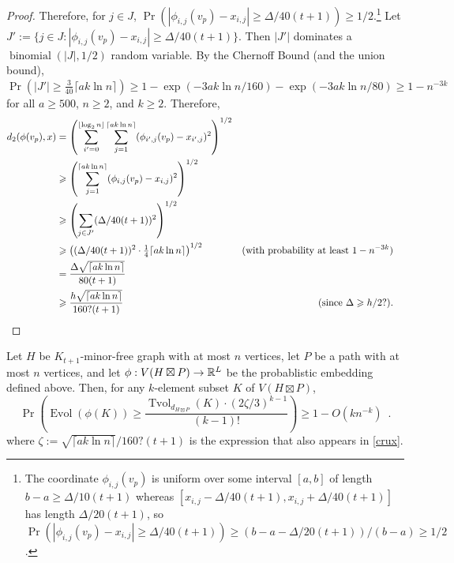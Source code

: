 \documentclass{patmorin}
\renewcommand{\ge}{\geqslant}
\DeclareMathOperator{\evol}{Evol}
\DeclareMathOperator{\tvol}{Tvol}
\begin{document}
\begin{proof}
  Therefore, for $j\in J$, $\Pr(|\phi_{i,j}(v_p)-x_{i,j}|\ge \Delta/40(t+1))\ge 1/2$.\footnote{The coordinate $\phi_{i,j}(v_p)$ is uniform over some interval $[a,b]$ of length $b-a\ge \Delta/10(t+1)$ whereas $[x_{i,j}-\Delta/40(t+1),x_{i,j}+\Delta/40(t+1)]$ has length $\Delta/20(t+1)$, so $\Pr(|\phi_{i,j}(v_p)-x_{i,j}|\ge \Delta/40(t+1))\ge (b-a-\Delta/20(t+1))/(b-a)\ge 1/2$.}
  Let $J':=\{j\in J:  |\phi_{i,j}(v_p)-x_{i,j}|\ge \Delta/40(t+1)\}$.  Then $|J'|$ dominates a $\operatorname{binomial}(|J|,1/2)$ random variable.  By the Chernoff Bound (and the union bound), $\Pr(|J'|\ge \tfrac{3}{40}\lceil a k\ln n\rceil)\ge 1-\exp(-3ak\ln n/160)-\exp(-3ak\ln n/80)\ge 1-n^{-3k}$ for all $a\ge 500$, $n\ge 2$, and $k\ge 2$. Therefore,
  \begin{align*}
    d_2(\phi(v_p),x)
    & = \left(\sum_{i'=0}^{\lfloor\log_2 n\rfloor}\sum_{j=1}^{\lceil ak\ln  n\rceil}(\phi_{i',j}(v_p)-x_{i',j})^2\right)^{1/2} \\
    & \ge \left(\sum_{j=1}^{\lceil ak\ln  n\rceil}(\phi_{i,j}(v_p)-x_{i,j})^2\right)^{1/2} \\
    & \ge \left(\sum_{j\in J'}(\Delta/40(t+1))^2\right)^{1/2} \\
    & \ge \left((\Delta/40(t+1))^2\cdot \tfrac{1}{4}\lceil ak\ln  n\rceil\right)^{1/2}
      & \text{(with probability at least $1-n^{-3k}$)} \\
    & = \frac{\Delta\sqrt{\lceil ak\ln  n\rceil}}{80(t+1)} \\
    & \ge \frac{h\sqrt{\lceil ak\ln n\rceil}}{160?(t+1)}
     & \text{(since $\Delta\ge h/2?$)}. &
    \qedhere
  \end{align*}
\end{proof}

\begin{lem}\label{volume_preserver}
  Let $H$ be $K_{t+1}$-minor-free graph with at most $n$ vertices, let $P$ be a path with at most $n$ vertices, and let $\phi:V(H\boxtimes P)\to\mathbb{R}^L$ be the probablistic embedding defined above.  Then, for any $k$-element subset $K$ of $V(H\boxtimes P)$,
  \[
    \Pr\left(\evol(\phi(K)) \ge \frac{\tvol_{d_{H\boxtimes P}}(K)\cdot(2\zeta/3)^{k-1}}{(k-1)!}\right) \ge 1- O(kn^{-k}) \enspace .
  \]
  where $\zeta:=\sqrt{\lceil ak\ln n\rceil}/160?(t+1)$ is the expression that also appears in \cref{crux}.
\end{lem}
\end{document}
